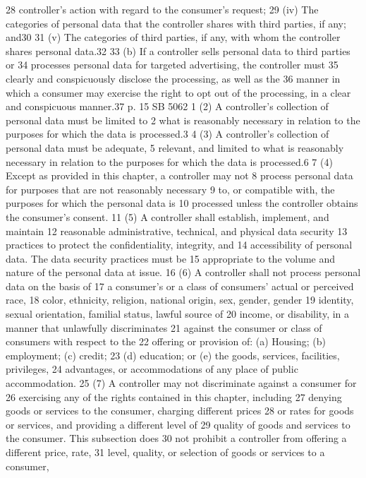 28 controller's action with regard to the consumer's request;
29 (iv) The categories of personal data that the controller shares
with third parties, if any; and30
31 (v) The categories of third parties, if any, with whom the
controller shares personal data.32
33 (b) If a controller sells personal data to third parties or
34 processes personal data for targeted advertising, the controller must
35 clearly and conspicuously disclose the processing, as well as the
36 manner in which a consumer may exercise the right to opt out of the
processing, in a clear and conspicuous manner.37
p. 15 SB 5062
1 (2) A controller's collection of personal data must be limited to
2 what is reasonably necessary in relation to the purposes for which
the data is processed.3
4 (3) A controller's collection of personal data must be adequate,
5 relevant, and limited to what is reasonably necessary in relation to
the purposes for which the data is processed.6
7 (4) Except as provided in this chapter, a controller may not
8 process personal data for purposes that are not reasonably necessary
9 to, or compatible with, the purposes for which the personal data is
10 processed unless the controller obtains the consumer's consent.
11 (5) A controller shall establish, implement, and maintain
12 reasonable administrative, technical, and physical data security
13 practices to protect the confidentiality, integrity, and
14 accessibility of personal data. The data security practices must be
15 appropriate to the volume and nature of the personal data at issue.
16 (6) A controller shall not process personal data on the basis of
17 a consumer's or a class of consumers' actual or perceived race,
18 color, ethnicity, religion, national origin, sex, gender, gender
19 identity, sexual orientation, familial status, lawful source of
20 income, or disability, in a manner that unlawfully discriminates
21 against the consumer or class of consumers with respect to the
22 offering or provision of: (a) Housing; (b) employment; (c) credit;
23 (d) education; or (e) the goods, services, facilities, privileges,
24 advantages, or accommodations of any place of public accommodation.
25 (7) A controller may not discriminate against a consumer for
26 exercising any of the rights contained in this chapter, including
27 denying goods or services to the consumer, charging different prices
28 or rates for goods or services, and providing a different level of
29 quality of goods and services to the consumer. This subsection does
30 not prohibit a controller from offering a different price, rate,
31 level, quality, or selection of goods or services to a consumer,
